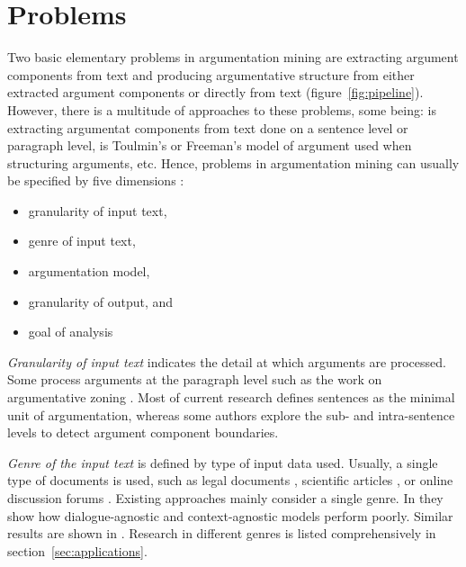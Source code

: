\section{Problems}
\label{sec:problems}

Two basic elementary problems in argumentation mining are 
extracting argument components from text and producing argumentative structure
from either extracted argument components or directly from text
(figure~\ref{fig:pipeline}). However, there is a multitude of approaches to these
problems, some being: is extracting argumentat components from text done on a sentence
level or paragraph level, is Toulmin's or Freeman's model of argument used 
when structuring arguments, etc. 
Hence, problems in argumentation mining can usually be specified by
five dimensions \citep{lippi2016argumentation}: 
\begin{itemize}
\item granularity of input text, 
\item genre of input text, 
\item argumentation model, 
\item granularity of output, and
\item goal of analysis
\end{itemize}

\emph{Granularity of input text} indicates the detail at which arguments
are processed. Some process arguments at the paragraph level 
such as the work on argumentative zoning
\citep{teufel2009towards}. Most of current research defines
sentences as the minimal unit of argumentation,
whereas some authors explore the sub- and intra-sentence levels
to detect argument component boundaries.

\emph{Genre of the input text} is defined by type of input data used.
Usually, a single type of documents is used, such as legal documents
\citep{palau2009argumentation}, 
scientific articles \citep{teufel2009towards}, or online discussion 
forums \citep{hasan2014you, boltuzic2014back, habernal2017argumentation}.
Existing approaches mainly consider a single genre. 
In \citep{budzynska2014towards} they show how dialogue-agnostic
and context-agnostic models perform poorly. 
Similar results are shown in \citep{daxenberger2017essence}. Research in
different genres is listed comprehensively in section~\ref{sec:applications}.

